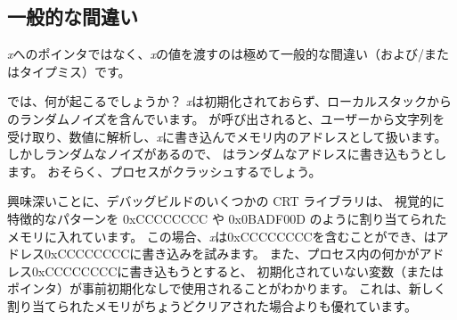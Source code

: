 \subsection{一般的な間違い}

\emph{x}へのポインタではなく、\emph{x}の値を渡すのは極めて一般的な間違い（および/またはタイプミス）です。



では、何が起こるでしょうか？ 
\emph{x}は初期化されておらず、ローカルスタックからのランダムノイズを含んでいます。 
\scanf が呼び出されると、ユーザーから文字列を受け取り、数値に解析し、\emph{x}に書き込んでメモリ内のアドレスとして扱います。 
しかしランダムなノイズがあるので、 \scanf はランダムなアドレスに書き込もうとします。 
おそらく、プロセスがクラッシュするでしょう。

興味深いことに、デバッグビルドのいくつかの \ac{CRT} ライブラリは、
視覚的に特徴的なパターンを 0xCCCCCCCC や 0x0BADF00D のように割り当てられたメモリに入れています。 
この場合、\emph{x}は0xCCCCCCCCを含むことができ、\scanf はアドレス0xCCCCCCCCに書き込みを試みます。 
また、プロセス内の何かがアドレス0xCCCCCCCCに書き込もうとすると、
初期化されていない変数（またはポインタ）が事前初期化なしで使用されることがわかります。 
これは、新しく割り当てられたメモリがちょうどクリアされた場合よりも優れています。
